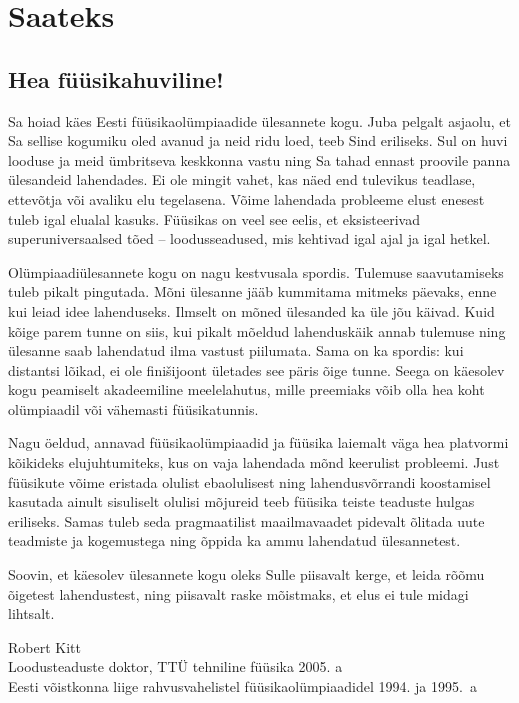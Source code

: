 \documentclass[11pt]{article}
\begin{document}
{\sloppy
\setlength{\parindent}{24pt}
\section*{Saateks}
\subsection*{Hea füüsikahuviline!}

Sa hoiad käes Eesti füüsikaolümpiaadide ülesannete kogu. Juba pelgalt asjaolu, et Sa sellise kogumiku oled avanud ja neid ridu loed, teeb Sind eriliseks. Sul on huvi looduse ja meid ümbritseva keskkonna vastu ning Sa tahad ennast proovile panna ülesandeid lahendades. Ei ole mingit vahet, kas näed end tulevikus teadlase, ettevõtja või avaliku elu tegelasena. Võime lahendada probleeme elust enesest tuleb igal elualal kasuks. Füüsikas on veel see eelis, et eksisteerivad superuniversaalsed tõed – loodusseadused, mis kehtivad igal ajal ja igal hetkel.

Olümpiaadiülesannete kogu on nagu kestvusala spordis. Tulemuse saavutamiseks tuleb pikalt pingutada. Mõni ülesanne jääb kummitama mitmeks päevaks, enne kui leiad idee lahenduseks. Ilmselt on mõned ülesanded ka üle jõu käivad. Kuid kõige parem tunne on siis, kui pikalt mõeldud lahenduskäik annab tulemuse ning ülesanne saab lahendatud ilma vastust piilumata. Sama on ka spordis: kui distantsi lõikad, ei ole finišijoont ületades see päris õige tunne. Seega on käesolev kogu peamiselt akadeemiline meelelahutus, mille preemiaks võib olla hea koht olümpiaadil või vähemasti füüsikatunnis.

Nagu öeldud, annavad füüsikaolümpiaadid ja füüsika laiemalt väga hea platvormi kõikideks elujuhtumiteks, kus on vaja lahendada mõnd keerulist probleemi.
Just füüsikute võime eristada olulist ebaolulisest ning lahendusvõrrandi koostamisel kasutada ainult sisuliselt olulisi mõjureid teeb füüsika teiste teaduste hulgas eriliseks. Samas tuleb seda pragmaatilist maailmavaadet pidevalt õlitada uute teadmiste ja kogemustega ning õppida ka ammu lahendatud ülesannetest.

Soovin, et käesolev ülesannete kogu oleks Sulle piisavalt kerge, et leida rõõmu õigetest lahendustest, ning piisavalt raske mõistmaks, et elus ei tule midagi lihtsalt.


\vspace{0.5\baselineskip}\noindent
Robert Kitt\\
Loodusteaduste doktor, TTÜ tehniline füüsika 2005. a\\
Eesti võistkonna liige rahvusvahelistel füüsikaolümpiaadidel 1994. ja 1995.~a

}
\end{document}
